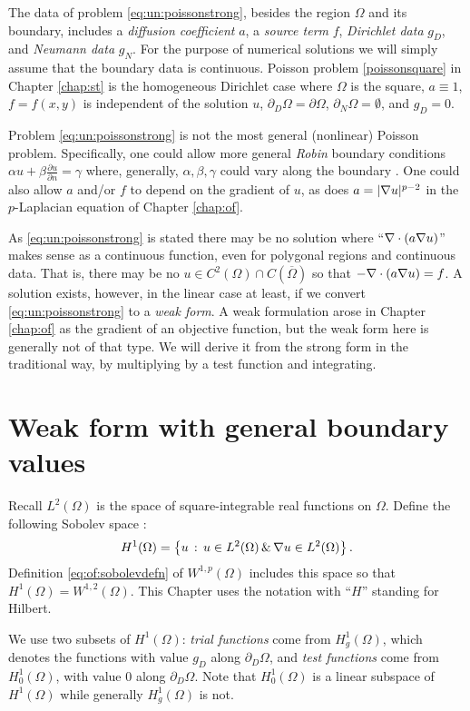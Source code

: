 The data of problem \eqref{eq:un:poissonstrong}, besides the region $\Omega$ and its boundary, includes a \emph{diffusion coefficient} $a$, a \emph{source term} $f$, \emph{Dirichlet data} $g_D$, and \emph{Neumann data} $g_N$.  For the purpose of numerical solutions we will simply assume that the boundary data is continuous.  Poisson problem \eqref{poissonsquare} in Chapter \ref{chap:st} is the homogeneous Dirichlet case where $\Omega$ is the square, $a\equiv 1$, $f=f(x,y)$ is independent of the solution $u$, $\partial_D \Omega = \partial \Omega$, $\partial_N \Omega = \emptyset$, and $g_D=0$.

Problem \eqref{eq:un:poissonstrong} is not the most general (nonlinear) Poisson problem.  Specifically, one could allow more general \emph{Robin} boundary conditions $\alpha u + \beta \frac{\partial u}{\partial n} = \gamma$ where, generally, $\alpha,\beta,\gamma$ could vary along the boundary \citep{Elmanetal2005}.  One could also allow $a$ and/or $f$ to depend on the gradient of $u$, as does $a=|\nabla u|^{p-2}$ in the $p$-Laplacian equation of Chapter \ref{chap:of}.

As \eqref{eq:un:poissonstrong} is stated there may be no solution where ``$\nabla\cdot(a\nabla u)$'' makes sense as a continuous function, even for polygonal regions and continuous data.  That is, there may be no $u\in C^2(\Omega) \cap C(\overline \Omega)$ so that $-\nabla\cdot(a\nabla u) = f$.  A solution exists, however, in the linear case at least, if we convert \eqref{eq:un:poissonstrong} to a \emph{weak form}.  A weak formulation arose in Chapter \ref{chap:of} as the gradient of an objective function, but the weak form here is generally not of that type.  We will derive it from the strong form in the traditional way, by multiplying by a test function and integrating.

\section{Weak form with general boundary values}

Recall $L^2(\Omega)$ is the space of square-integrable real functions on $\Omega$.  Define the following Sobolev space \citep{Evans2010}:
    $$H^1(\Omega) = \left\{u \,:\, u \in L^2(\Omega) \,\&\, \nabla u \in L^2(\Omega)\right\}.$$
Definition \eqref{eq:of:sobolevdefn} of $W^{1,p}(\Omega)$ includes this space so that $H^1(\Omega) = W^{1,2}(\Omega)$.  This Chapter uses the notation with ``$H$'' standing for Hilbert.

We use two subsets of $H^1(\Omega)$: \emph{trial functions} come from $H_{g}^1(\Omega)$, which denotes the functions with value $g_D$ along $\partial_D \Omega$, and \emph{test functions} come from $H_{0}^1(\Omega)$, with value $0$ along $\partial_D \Omega$.  Note that $H_{0}^1(\Omega)$ is a linear subspace of $H^1(\Omega)$ while generally $H_{g}^1(\Omega)$ is not.


